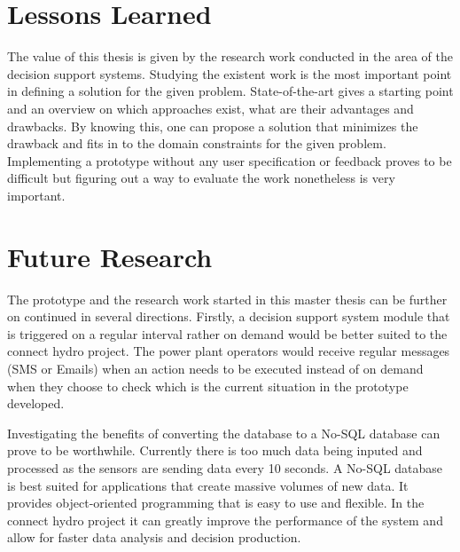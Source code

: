 \section{Lessons Learned}
\label{sec:LessonsLearned}
The value of this thesis is given by the research work conducted in the area of the decision support systems. Studying the existent work is the most important point in defining a solution for the given problem. State-of-the-art gives a starting point and an overview on which approaches exist, what are their advantages and drawbacks. By knowing this, one can propose a solution that minimizes the drawback and fits in to the domain constraints for the given problem. Implementing a prototype without any user specification or feedback proves to be difficult but figuring out a way to evaluate the work nonetheless is very important.
\section{Future Research}
\label{sec:FutureResearch}
The prototype and the research work started in this master thesis can be further on continued in several directions. Firstly, a decision support system module that is triggered on a regular interval rather on demand would be better suited to the connect hydro project. The power plant operators would receive regular messages (SMS or Emails) when an action needs to be executed instead of on demand when they choose to check which is the current situation in the prototype developed. 

Investigating the benefits of converting the database to a No-SQL database can prove to be worthwhile. Currently there is too much data being inputed and processed as the sensors are sending data every 10 seconds. A No-SQL database is best suited for applications that create massive volumes of new data. It provides object-oriented programming that is easy to use and flexible. In the connect hydro project it can greatly improve the performance of the system and allow for faster data analysis and decision production.

